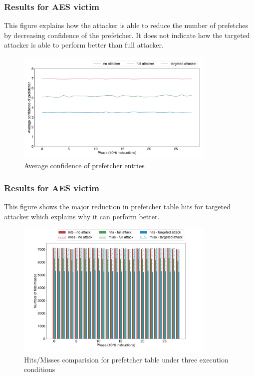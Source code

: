 \documentclass[10pt]{beamer}
\begin{document}
\begin{frame}
\frametitle{Results for AES victim}
This figure explains how the attacker is able to reduce the number of prefetches by decreasing
confidence of the prefetcher. It does not indicate how the targeted attacker is able to perform
better than full attacker.
\begin{figure}[ht]
    \centering
    \includegraphics[width=0.85\textwidth]{avg_conf}
    \caption{Average confidence of prefetcher entries}
    \label{fig:prefetch_attack}
\end{figure}
\end{frame}


\begin{frame}
\frametitle{Results for AES victim}
This figure shows the major reduction in prefetcher table hits for targeted attacker which
explains why it can perform better.
\begin{figure}[ht]
    \centering
    \includegraphics[width=0.85\textwidth]{pf_hits}
    \caption{Hits/Misses comparision for prefetcher table under three execution conditions}
\end{figure}
\end{frame}
\end{document}

